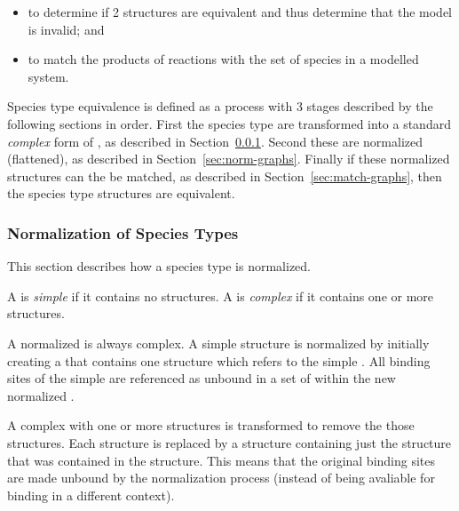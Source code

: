 \documentclass{cekarticle}
\begin{document}
\begin{itemize}

\item to determine if 2  structures are equivalent
and thus determine that the model is invalid; and

\item to match the products of reactions with the set of species
in a modelled system.

\end{itemize}

Species type equivalence is defined as a process with 3 stages
described by the following sections in order.  First the species
type are transformed into a standard \emph{complex} form of
, as described in
Section~\ref{sec:trans-type}. Second these 
are normalized (flattened), as described in
Section~\ref{sec:norm-graphs}. Finally if these normalized
structures can the be matched, as described in
Section~\ref{sec:match-graphs}, then the species type structures
are equivalent.

\subsubsection{Normalization of Species Types}
\label{sec:trans-type}

This section describes how a species type is normalized.

A  is \emph{simple} if it contains no  structures.
A  is \emph{complex} if it contains one or more  structures.

A normalized  is always complex. A simple
 structure is normalized by initially creating
a  that contains one
 structure which refers to the simple
. All binding sites of the simple
 are referenced as unbound in a set of
 within the new normalized
.

A complex  with one or more  structures is transformed
to remove the those structures.  Each  structure is replaced by a
 structure containing just the  structure
that was contained in the  structure.  This means that the original
binding sites are made unbound by the normalization process
(instead of being avaliable for binding in a different context).
\end{document}
